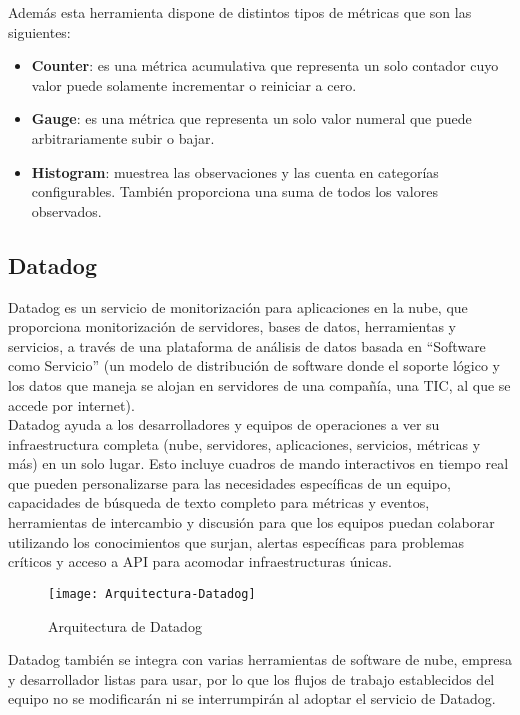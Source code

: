 \documentclass[ spanish, a4paper, 12pt, oneside]{report}
\begin{document}
Además esta herramienta dispone de distintos tipos de métricas que son las siguientes:

\begin{itemize}
   \item \textbf{Counter}: es una métrica acumulativa que representa un solo contador cuyo valor puede solamente incrementar o reiniciar a cero.
   \item \textbf{Gauge}: es una métrica que representa un solo valor numeral que puede arbitrariamente subir o bajar.
   \item \textbf{Histogram}: muestrea las observaciones y las cuenta en categorías configurables. También proporciona una suma de todos los valores observados.
\end{itemize}

\subsection{Datadog}

Datadog es un servicio de monitorización para aplicaciones en la nube, que proporciona monitorización de servidores, bases de datos, herramientas y servicios, a través de una plataforma de análisis de datos basada en ``Software como Servicio'' 
(un modelo de distribución de software donde el soporte lógico y los datos que maneja se alojan en servidores de una compañía, una TIC, al que se accede por internet). \\

Datadog ayuda a los desarrolladores y equipos de operaciones a ver su infraestructura completa (nube, servidores, aplicaciones, servicios, métricas y más) en un solo lugar. Esto incluye cuadros de mando interactivos en tiempo 
real que pueden personalizarse para las necesidades específicas de un equipo, capacidades de búsqueda de texto completo para métricas y eventos, herramientas de intercambio y discusión para que los equipos puedan colaborar utilizando 
los conocimientos que surjan, alertas específicas para problemas críticos y acceso a API para acomodar infraestructuras únicas. \\

\begin{figure}[!h]
   \centering
   \texttt{[image: Arquitectura-Datadog]}\\
      \caption{\label{fig: Arquitectura de Datadog} Arquitectura de Datadog}
\end{figure}

Datadog también se integra con varias herramientas de software de nube, empresa y desarrollador listas para usar, por lo que los flujos de trabajo establecidos del equipo no se modificarán ni se interrumpirán al adoptar el servicio de Datadog.\\
\end{document}

